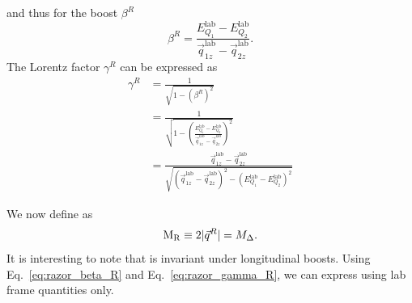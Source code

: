 and thus for the boost $\beta^R$
\begin{equation}
  \beta^R = \frac{E_{Q_1}^{\textrm{lab}} - E_{Q_2}^{\textrm{lab}}}{\vec{q}_{1z}^{\textrm{lab}} -
\vec{q}_{2z}^{\textrm{lab}}} . \label{eq:razor_beta_R}
\end{equation}
The Lorentz factor $\gamma^R$ can be expressed as
\begin{align}
  \gamma^R &= \frac{1}{\sqrt{1 - (\beta^R)^2}} \\
	   &= \frac{1}{\sqrt{1 - \left( \frac{E_{Q_1}^{\textrm{lab}} -
E_{Q_2}^{\textrm{lab}}}{\vec{q}_{1z}^{\textrm{lab}} -
\vec{q}_{2z}^{\textrm{lab}}} \right)^2}} \\
           &= \frac{ \vec{q}_{1z}^{\textrm{lab}} - \vec{q}_{2z}^{\textrm{lab}} }{\sqrt{ \left(
 \vec{q}_{1z}^{\textrm{lab}} - \vec{q}_{2z}^{\textrm{lab}} \right)^2 - \left(
 E_{Q_1}^{\textrm{lab}} - E_{Q_2}^{\textrm{lab}}\right)^2 }} \label{eq:razor_gamma_R}
\end{align}

We now define \mr as
\begin{equation}
  \mathrm{M_R} \equiv 2 |\vec{q}^R| = M_\Delta .
\end{equation}
It is interesting to note that \mr is invariant under longitudinal boosts. Using
Eq.~\ref{eq:razor_beta_R} and Eq.~\ref{eq:razor_gamma_R}, we can express \mr using lab frame
quantities only. 

